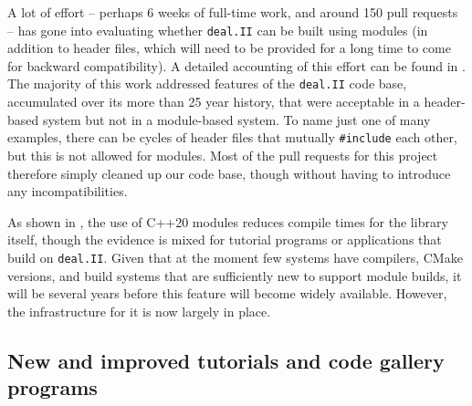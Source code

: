 \documentclass{ansarticle-preprint}
\newcommand{\specialword}[1]{\texttt{#1}}
\newcommand{\dealii}{{\specialword{deal.II}}\xspace}
\begin{document}
A lot of effort -- perhaps 6 weeks of full-time work, and around 150
pull requests -- has gone into evaluating whether \dealii{} can be
built using modules (in addition to header files, which will need to
be provided for a long time to come for backward compatibility). A
detailed accounting of this effort can be found in 
\cite{bangerth2025experienceconvertinglargemathematical}. The majority
of this work addressed features of the \dealii{} code base,
accumulated over its more than 25 year history, that were acceptable
in a header-based system but not in a module-based system. To name
just one of many examples, there can be cycles of header files that mutually
\texttt{\#include} each other, but this is not allowed for
modules. Most of the pull requests for this project therefore simply
cleaned up our code base, though without having to introduce any
incompatibilities.

As shown in \cite{bangerth2025experienceconvertinglargemathematical},
the use of C++20 modules
reduces compile times for the library itself, though the evidence is
mixed for tutorial programs or applications that build on
\dealii{}. Given that at the moment few systems have compilers, CMake
versions, and build systems that are sufficiently new to support
module builds, it will be several years before this feature will
become widely available. However, the infrastructure for it is now
largely in place.


\subsection{New and improved tutorials and code gallery programs}
\label{subsec:steps}
\end{document}
